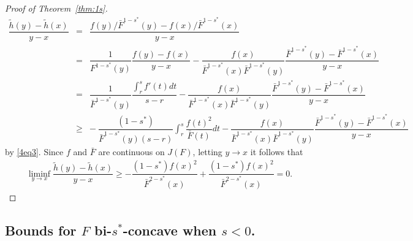 \documentclass[11pt]{amsart}
\numberwithin{equation}{section}
\theoremstyle{definition}\newtheorem{definition}{Definition}
\theoremstyle{remark}\newtheorem{assumption}{Assumption}
\theoremstyle{remark}\newtheorem{remark}{Remark}
\theoremstyle{definition}\newtheorem{example}{Example}
\theoremstyle{plain}\newtheorem{question}{Question}
\theoremstyle{plain}\newtheorem{theorem}{Theorem}
\theoremstyle{plain}\newtheorem{lemma}{Lemma}
\theoremstyle{plain}\newtheorem{proposition}{Proposition}
\theoremstyle{plain}\newtheorem{corollary}{Corollary}
\theoremstyle{plain}\newtheorem{conjecture}{Conjecture}
\begin{document}
\begin{proof}[Proof of Theorem~\ref{thm:1s}]
  \begin{eqnarray*}
 \dfrac{\tilde{h}(y)-\tilde{h}(x)}{y-x}
 & = &\dfrac{f(y)/\bar{F}^{1-s^*}(y)-f(x)/\bar{F}^{1-s^*}(x)}{y-x}\\
 & = & \dfrac{1}{F^{1-s^*}(y)}\dfrac{f(y)-f(x)}{y-x}-\dfrac{f(x)}{\bar{F}^{1-s^*}(x)\bar{F}^{1-s^*}(y)}\dfrac{\bar{F}^{1-s^*}(y)-\bar{F}^{1-s^*}(x)}{y-x}\\
 & = &  \dfrac{1}{\bar{F}^{1-s^*}(y)}\dfrac{\int_{r}^{s}f'(t)dt}{s-r}-\dfrac{f(x)}{\bar{F}^{1-s^*}(x)\bar{F}^{1-s^*}(y)}\dfrac{\bar{F}^{1-s^*}(y)-\bar{F}^{1-s^*}(x)}{y-x}\\
 & \geq &   - \ \dfrac{(1-s^*)}{\bar{F}^{1-s^*}(y)(s-r)}\int_{r}^{s}\dfrac{f(t)^2}{\bar{F}(t)}dt-\dfrac{f(x)}{\bar{F}^{1-s^*}(x)\bar{F}^{1-s^*}(y)}\dfrac{\bar{F}^{1-s^*}(y)-\bar{F}^{1-s^*}(x)}{y-x}
 \end{eqnarray*}
 by \eqref{4eq3}. Since $f$ and $\bar{F}$ are continuous on 
 $J(F)$,  letting $y\to x$ it follows that
 \begin{eqnarray*}
 \liminf_{y\to x}\dfrac{\tilde{h}(y)-\tilde{h}(x)}{y-x} 
 \geq  -\dfrac{(1-s^*)f(x)^2}{\bar{F}^{2-s^*}(x)}+\dfrac{(1-s^*)f(x)^2}{\bar{F}^{2-s^*}(x)}=0.
 \end{eqnarray*}
\end{proof}
\smallskip

\subsection{Bounds for $F$ bi-$s^*$-concave when $s<0$.}
\label{subsec:boundsSNeg}  
\end{document}
